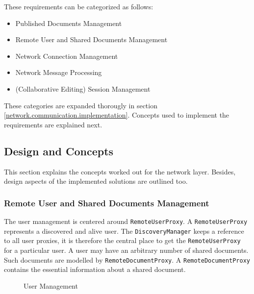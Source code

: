 These requirements can be categorized as follows:

\begin{itemize}
 \item Published Documents Management
 \item Remote User and Shared Documents Management
 \item Network Connection Management
 \item Network Message Processing
 \item (Collaborative Editing) Session Management
\end{itemize}

These categories are expanded thorougly in section \ref{network.communication.implementation}. Concepts used to implement the requirements are explained next.

\subsection{Design and Concepts}
This section explains the concepts worked out for the network layer. Besides, design aspects of the implemented solutions are outlined too.

\subsubsection{Remote User and Shared Documents Management}
The user management is centered around \texttt{RemoteUserProxy}. A  \texttt{Remote\-User\-Proxy} represents a discovered and alive user. The  \texttt{DiscoveryManager} keeps a reference to all user proxies, it is therefore the central place to get the  \texttt{RemoteUserProxy} for a particular user. A user may have an arbitrary number of shared documents. Such documents are modelled by  \texttt{RemoteDocumentProxy}. A  \texttt{RemoteDocumentProxy} contains the essential information about a shared document.

\begin{figure}[H]
 \centering
 \caption{User Management}
 \label{fig:network.discovery.usermanagement}
\end{figure}

